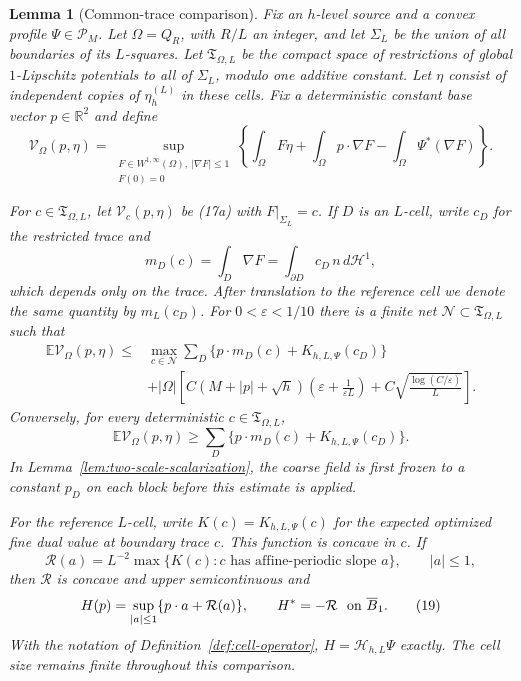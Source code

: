 \documentclass[11pt,reqno]{amsart}
\theoremstyle{plain}
\newtheorem{lemma}[theorem]{Lemma}
\theoremstyle{definition}
\theoremstyle{remark}
\numberwithin{equation}{section}
\newcommand{\1}{\mathbf 1}
\begin{document}
\begin{lemma}[Common-trace comparison]\label{lem:finite-trace-net}
Fix an $h$-level source and a convex profile $\Psi\in\mathscr P_ M$.
Let $\Omega=Q_ R$, with $R/L$ an integer, and let $\Sigma_ L$ be
the union of all boundaries of its $L$-squares.  Let
$\mathfrak T_ {\Omega,L}$ be the compact space of restrictions of global
$1$-Lipschitz potentials to all of $\Sigma_ L$, modulo one additive
constant.  Let $\eta$ consist of independent
copies of $\eta_h^{(L)}$ in these cells.  Fix a deterministic constant
base vector $p\in\mathbb R^2$ and define
\begin{equation}
\mathcal V_ {\Omega}(p,\eta)=
\sup_ {\substack{F\in W^{1,\infty}(\Omega),\ |\nabla F|\leq1\\F(0)=0}}
\left\{\int_ \Omega F\eta+\int_ \Omega p\cdot\nabla F
-\int_ \Omega\Psi^*(\nabla F)\right\}.
\tag{17a}
\end{equation}

For $c\in\mathfrak T_ {\Omega,L}$, let
$\mathcal V_ c(p,\eta)$ be (17a) with $F|_ {\Sigma_ L}=c$.
If $D$ is an $L$-cell, write $c_ D$ for
the restricted trace and
\begin{equation}
m_ D(c)=\int_ D\nabla F
=\int_ {\partial D}c_ D\,n\,d\mathcal H^1,
\tag{17b}
\end{equation}
which depends only on the trace.  After translation to the reference
cell we denote the same quantity by $m_ L(c_ D)$.  For
$0<\varepsilon<1/10$ there is
a finite net $\mathcal N\subset\mathfrak T_ {\Omega,L}$ such that
\begin{equation}
\begin{split}
\mathbb E\mathcal V_ \Omega(p,\eta)
\leq{}&\max_ {c\in\mathcal N}
\sum_ D\{p\cdot m_ D(c)+K_ {h,L,\Psi}(c_ D)\}\\
&+|\Omega|\left[
C(M+|p|+\sqrt h)\left(\varepsilon+\frac1{\varepsilon L}\right)
+C\sqrt{\frac{\log(C/\varepsilon)}L}\right].                   
\end{split}
\tag{17}
\end{equation}
Conversely, for every deterministic $c\in\mathfrak T_{\Omega,L}$,
\begin{equation}
\mathbb E\mathcal V_ \Omega(p,\eta)
\geq\sum_ D\{p\cdot m_ D(c)+K_ {h,L,\Psi}(c_ D)\}.
\tag{17c}
\end{equation}
In Lemma~\ref{lem:two-scale-scalarization}, the coarse field is first
frozen to a constant $p_D$ on each block before this estimate is applied.

For the reference $L$-cell, write $K(c)=K_{h,L,\Psi}(c)$ for the expected
optimized fine dual value at boundary trace $c$.  This function is
concave in $c$.  If
\begin{equation}
\mathcal R(a)=L^{-2}\max\{K(c):c\text{ has affine-periodic slope }a\},
\qquad |a|\leq1,
\tag{18}
\end{equation}
then $\mathcal R$ is concave and upper semicontinuous and
\begin{equation}
H(p)=\sup_ {|a|\leq1}\{p\cdot a+\mathcal R(a)\},\qquad H^*=-\mathcal R
\ \hbox{ on }\overline B_ 1.
\tag{19}
\end{equation}
With the notation of Definition~\ref{def:cell-operator},
$H=\mathcal H_ {h,L}\Psi$ exactly.  The cell size remains finite throughout this comparison.


\end{lemma}
\end{document}
